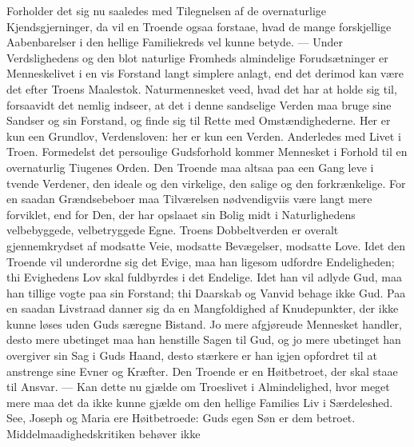 \documentclass[12pt,a4paper]{book}
\begin{document}
Forholder det sig nu saaledes med Tilegnelsen af de overnaturlige Kjendsgjerninger,
da vil en Troende ogsaa forstaae,
hvad de mange forskjellige Aabenbarelser i den hellige Familiekreds vel kunne betyde.
--- Under Verdslighedens og den blot naturlige Fromheds almindelige Forudsætninger er
Menneskelivet i en vis Forstand langt simplere anlagt, end det derimod kan være det
efter Troens Maalestok. Naturmennesket veed, hvad det har at holde sig til,
forsaavidt det nemlig indseer, at det i denne sandselige Verden maa bruge sine Sandser
og sin Forstand, og finde sig til Rette med Omstændighederne. Her er kun een
Grundlov, Verdensloven: her er kun een Verden. Anderledes med Livet i Troen.
Formedelst det persoulige Gudsforhold kommer Mennesket i Forhold til en overnaturlig
Tiugenes Orden. Den Troende maa altsaa paa een Gang leve i tvende Verdener, den ideale
og den virkelige, den salige og den forkrænkelige. For en saadan Grændsebeboer maa
Tilværelsen nødvendigviis være langt mere forviklet, end for Den, der har opslaaet sin
Bolig midt i Naturlighedens velbebyggede, velbetryggede Egne. Troens Dobbeltverden er
overalt gjennemkrydset af modsatte Veie, modsatte Bevægelser, modsatte Love. Idet den
Troende vil underordne sig det Evige, maa han ligesom udfordre Endeligheden; thi
Evighedens Lov skal fuldbyrdes i det Endelige. Idet han vil adlyde Gud, maa han
tillige vogte paa sin Forstand; thi Daarskab og Vanvid behage ikke Gud. Paa en saadan
Livstraad danner sig da en Mangfoldighed af Knudepunkter, der ikke kunne løses uden
Guds særegne Bistand. Jo mere afgjøreude Mennesket handler, desto mere ubetinget maa
han henstille Sagen til Gud, og jo mere ubetinget han overgiver sin Sag i Guds Haand,
desto stærkere er han igjen opfordret til at anstrenge sine Evner og Kræfter. Den
Troende er en Høitbetroet, der skal staae til Ansvar. --- Kan dette nu gjælde om
Troeslivet i Almindelighed, hvor meget mere maa det da ikke kunne gjælde om den
hellige Families Liv i Særdeleshed. See, Joseph og Maria
ere Høitbetroede: Guds egen Søn er dem betroet. Middelmaadighedskritiken behøver ikke
\end{document}
